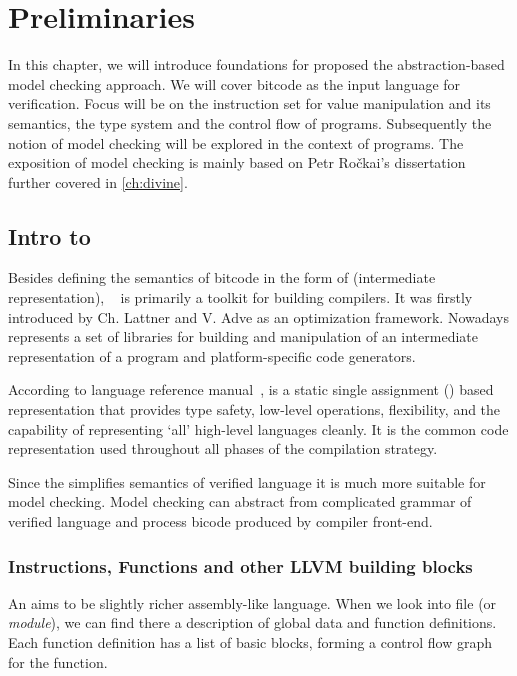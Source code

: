 \chapter{Preliminaries}\label{ch:preliminaries}

In this chapter, we will introduce foundations for proposed the
abstraction-based model checking approach. We will cover \LLVM bitcode as the
input language for verification. Focus will be on the instruction set for
value manipulation and its semantics, the \LLVM type system and the control flow
of programs. Subsequently the notion of model checking will be explored in
the context of \LLVM programs. The exposition of model checking is mainly based on
Petr Ročkai's dissertation \cite{Rockai15} further covered in \autoref{ch:divine}.

\section{Intro to \LLVMIR} \label{sec:introtollvm}

Besides defining the semantics of bitcode in the form of \LLVMIR (intermediate
representation), \LLVM{}~\cite{LLVM:web} is primarily a toolkit for building
compilers. It was firstly introduced by Ch. Lattner and V. Adve \cite{Lattner04}
as an optimization framework. Nowadays \LLVM represents a set of libraries for
building and manipulation of an intermediate representation of a program and
platform-specific code generators.

According to \LLVM language reference manual~\cite{LLVM:langref},
\LLVM is a static single assignment (\SSA) based representation that
provides type safety, low-level operations, flexibility, and
the capability of representing ‘all’ high-level languages cleanly. It is the
common code representation used throughout all phases of the \LLVM compilation
strategy.

Since the \LLVMIR simplifies semantics of verified language it is much more
suitable for model checking. Model checking can abstract from complicated
grammar of verified language and process \LLVM bicode produced by compiler
front-end.

\subsection{Instructions, Functions and other LLVM building blocks} \label{subsec:infnllvm}
An \LLVMIR aims to be slightly richer assembly-like language. When we look
into \LLVMIR file (or \emph{module}), we can find there a description of global
data and function definitions. Each function definition has a list of basic blocks,
forming a control flow graph for the function.

